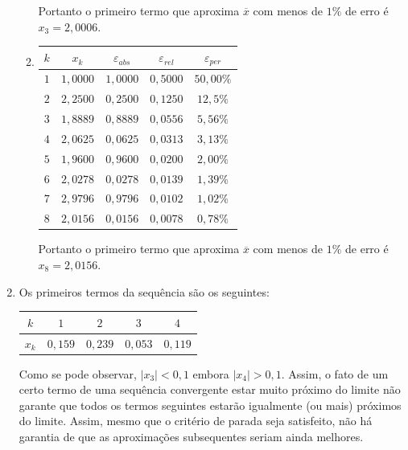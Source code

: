 \documentclass[12pt,a4paper]{article}
\begin{document}
\begin{enumerate}
\begin{enumerate}
Portanto o primeiro termo que aproxima $\overline{x}$ com menos de $1\%$ de erro é $x_3 = 2,0006$.
\item
\begin{tabular}{|c|c|c|c|c|}
\hline
$k$ & $x_k$ & $\varepsilon_{abs}$ & $\varepsilon_{rel}$ & $\varepsilon_{per}$ \\
\hline
$1$ & $1,0000$ & $1,0000$ & $0,5000$ & $50,00\%$ \\
\hline
$2$ & $2,2500$ & $0,2500$ & $0,1250$ & $12,5\%$ \\
\hline
$3$ & $1,8889$ & $0,8889$ & $0,0556$ & $5,56\%$ \\
\hline
$4$ & $2,0625$ & $0,0625$ & $0,0313$ & $3,13\%$ \\
\hline
$5$ & $1,9600$ & $0,9600$ & $0,0200$ & $2,00\%$ \\
\hline
$6$ & $2,0278$ & $0,0278$ & $0,0139$ & $1,39\%$ \\
\hline
$7$ & $2,9796$ & $0,9796$ & $0,0102$ & $1,02\%$ \\
\hline
$8$ & $2,0156$ & $0,0156$ & $0,0078$ & $0,78\%$ \\
\hline
\end{tabular}

Portanto o primeiro termo que aproxima $\overline{x}$ com menos de $1\%$ de erro é $x_8 = 2,0156$.
\end{enumerate}
\item Os primeiros termos da sequência são os seguintes:
\begin{center}
\begin{tabular}{|c|c|c|c|c|}
\hline
$k$   & $1$   & $2$   & $3$   & $4$\\
\hline
$x_k$ & $0,159$ & $0,239$ & $0,053$ & $0,119$ \\
\hline
\end{tabular}
\end{center}
Como se pode observar, $|x_3| < 0,1$ embora $|x_4| > 0,1$. Assim, o fato de um certo termo de uma sequência convergente estar muito próximo do limite não garante que todos os termos seguintes estarão igualmente (ou mais) próximos do limite. Assim, mesmo que o critério de parada seja satisfeito, não há garantia de que as aproximações subsequentes seriam ainda melhores.
\end{enumerate}
\end{document}
